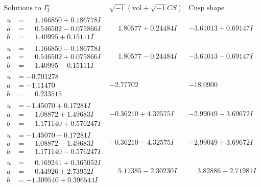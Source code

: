 \documentclass[1p]{elsarticle_modified}
\theoremstyle{definition}
\newcommand{\I}{\sqrt{-1}}
\begin{document}
$$\begin{array}{c|c|c}  
\text{Solutions to }I^u_{3}& \I (\text{vol} + \sqrt{-1}CS) & \text{Cusp shape}\\
 \hline 
\begin{aligned}
u &= \phantom{-}1.166850 + 0.186778 I \\
a &= \phantom{-}0.546502 - 0.075866 I \\
b &= \phantom{-}1.40995 + 0.15111 I\end{aligned}
 & \phantom{-}1.80577 + 0.24484 I & -3.61013 + 0.69147 I \\ \hline\begin{aligned}
u &= \phantom{-}1.166850 - 0.186778 I \\
a &= \phantom{-}0.546502 + 0.075866 I \\
b &= \phantom{-}1.40995 - 0.15111 I\end{aligned}
 & \phantom{-}1.80577 - 0.24484 I & -3.61013 - 0.69147 I \\ \hline\begin{aligned}
u &= -0.701278\phantom{ +0.000000I} \\
a &= -1.11470\phantom{ +0.000000I} \\
b &= \phantom{-}0.233515\phantom{ +0.000000I}\end{aligned}
 & -2.77702\phantom{ +0.000000I} & -18.0900\phantom{ +0.000000I} \\ \hline\begin{aligned}
u &= -1.45070 + 0.17281 I \\
a &= \phantom{-}1.08872 + 1.49683 I \\
b &= \phantom{-}1.171140 + 0.576247 I\end{aligned}
 & -0.36210 + 4.32575 I & -2.99049 - 3.69672 I \\ \hline\begin{aligned}
u &= -1.45070 - 0.17281 I \\
a &= \phantom{-}1.08872 - 1.49683 I \\
b &= \phantom{-}1.171140 - 0.576247 I\end{aligned}
 & -0.36210 - 4.32575 I & -2.99049 + 3.69672 I \\ \hline\begin{aligned}
u &= \phantom{-}0.169241 + 0.365052 I \\
a &= \phantom{-}0.44926 + 2.73952 I \\
b &= -1.309540 + 0.396544 I\end{aligned}
 & \phantom{-}5.17385 - 2.30230 I & \phantom{-}3.82886 + 2.71981 I \\ \hline\begin{aligned}

\end{aligned}
\end{array}$$
\end{document}
